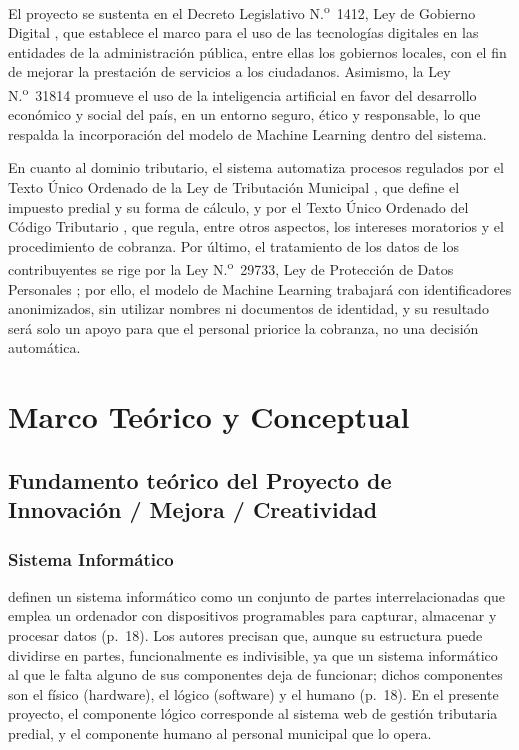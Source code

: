 \documentclass[12pt,a4paper]{report}
\begin{document}
El proyecto se sustenta en el Decreto Legislativo N.\textsuperscript{o}~1412, Ley de Gobierno Digital \parencite{dleg1412}, que establece el marco para el uso de las tecnologías digitales en las entidades de la administración pública, entre ellas los gobiernos locales, con el fin de mejorar la prestación de servicios a los ciudadanos. Asimismo, la Ley N.\textsuperscript{o}~31814 \parencite{ley31814} promueve el uso de la inteligencia artificial en favor del desarrollo económico y social del país, en un entorno seguro, ético y responsable, lo que respalda la incorporación del modelo de Machine Learning dentro del sistema.

En cuanto al dominio tributario, el sistema automatiza procesos regulados por el Texto Único Ordenado de la Ley de Tributación Municipal \parencite{tuoltm}, que define el impuesto predial y su forma de cálculo, y por el Texto Único Ordenado del Código Tributario \parencite{codigotributario}, que regula, entre otros aspectos, los intereses moratorios y el procedimiento de cobranza. Por último, el tratamiento de los datos de los contribuyentes se rige por la Ley N.\textsuperscript{o}~29733, Ley de Protección de Datos Personales \parencite{ley29733}; por ello, el modelo de Machine Learning trabajará con identificadores anonimizados, sin utilizar nombres ni documentos de identidad, y su resultado será solo un apoyo para que el personal priorice la cobranza, no una decisión automática.

\section{Marco Teórico y Conceptual}

\subsection{Fundamento teórico del Proyecto de Innovación / Mejora / Creatividad}

\subsubsection{Sistema Informático}
\textcite{raya2014} definen un sistema informático como un conjunto de partes interrelacionadas que emplea un ordenador con dispositivos programables para capturar, almacenar y procesar datos (p.~18). Los autores precisan que, aunque su estructura puede dividirse en partes, funcionalmente es indivisible, ya que un sistema informático al que le falta alguno de sus componentes deja de funcionar; dichos componentes son el físico (hardware), el lógico (software) y el humano (p.~18). En el presente proyecto, el componente lógico corresponde al sistema web de gestión tributaria predial, y el componente humano al personal municipal que lo opera.
\end{document}
